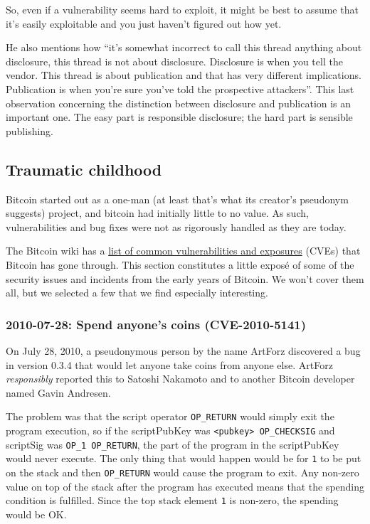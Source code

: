 So, even if a vulnerability seems hard to exploit, it might be best to
assume that it's easily exploitable and you just haven't figured out how
yet.

He also mentions how ``it's somewhat incorrect to call this thread
anything about disclosure, this thread is not about disclosure.
Disclosure is when you tell the vendor. This thread is about publication
and that has very different implications. Publication is when you're
sure you've told the prospective attackers''. This last observation
concerning the distinction between disclosure and publication is an
important one. The easy part is responsible disclosure; the hard part is
sensible publishing.

\hypertarget{_traumatic_childhood}{%
\subsection{Traumatic childhood}\label{_traumatic_childhood}}

Bitcoin started out as a one-man (at least that's what its creator's
pseudonym suggests) project, and bitcoin had initially little to no
value. As such, vulnerabilities and bug fixes were not as rigorously
handled as they are today.

The Bitcoin wiki has a
\href{https://en.bitcoin.it/wiki/Common_Vulnerabilities_and_Exposures}{list
of common vulnerabilities and exposures} (CVEs) that Bitcoin has gone
through. This section constitutes a little exposé of some of the
security issues and incidents from the early years of Bitcoin. We won't
cover them all, but we selected a few that we find especially
interesting.

\hypertarget{cve-2010-5141}{%
\subsubsection{2010-07-28: Spend anyone's coins
(CVE-2010-5141)}\label{cve-2010-5141}}

On July 28, 2010, a pseudonymous person by the name ArtForz discovered a
bug in version 0.3.4 that would let anyone take coins from anyone else.
ArtForz \emph{responsibly} reported this to Satoshi Nakamoto and to
another Bitcoin developer named Gavin Andresen.

The problem was that the script operator \texttt{OP\_RETURN} would
simply exit the program execution, so if the scriptPubKey was
\texttt{\textless{}pubkey\textgreater{}\ OP\_CHECKSIG} and scriptSig was
\texttt{OP\_1\ OP\_RETURN}, the part of the program in the scriptPubKey
would never execute. The only thing that would happen would be for
\texttt{1} to be put on the stack and then \texttt{OP\_RETURN} would
cause the program to exit. Any non-zero value on top of the stack after
the program has executed means that the spending condition is fulfilled.
Since the top stack element \texttt{1} is non-zero, the spending would
be OK.

